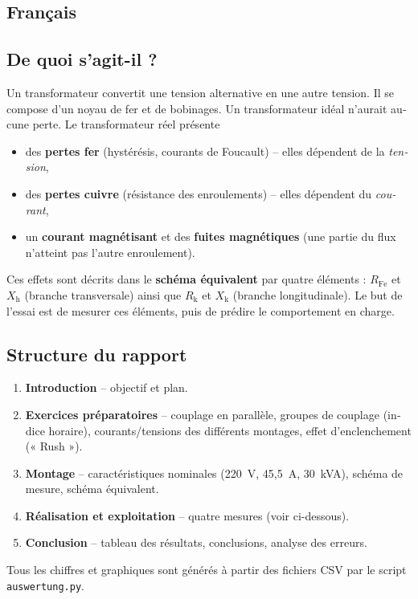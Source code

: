 \documentclass[a4paper,11pt]{article}
\begin{document}
\newpage
\begin{french}
\section{Français}

\subsection{De quoi s'agit-il ?}
Un transformateur convertit une tension alternative en une autre tension. Il se compose d'un noyau de fer et de bobinages. Un transformateur idéal n'aurait aucune perte. Le transformateur réel présente
\begin{itemize}[nosep]
  \item des \textbf{pertes fer} (hystérésis, courants de Foucault) -- elles dépendent de la \emph{tension},
  \item des \textbf{pertes cuivre} (résistance des enroulements) -- elles dépendent du \emph{courant},
  \item un \textbf{courant magnétisant} et des \textbf{fuites magnétiques} (une partie du flux n'atteint pas l'autre enroulement).
\end{itemize}
Ces effets sont décrits dans le \textbf{schéma équivalent} par quatre éléments : $R_\mathrm{Fe}$ et $X_\mathrm{h}$ (branche transversale) ainsi que $R_\mathrm{k}$ et $X_\mathrm{k}$ (branche longitudinale). Le but de l'essai est de mesurer ces éléments, puis de prédire le comportement en charge.

\subsection{Structure du rapport}
\begin{enumerate}[nosep]
  \item \textbf{Introduction} -- objectif et plan.
  \item \textbf{Exercices préparatoires} -- couplage en parallèle, groupes de couplage (indice horaire), courants/tensions des différents montages, effet d'enclenchement (« Rush »).
  \item \textbf{Montage} -- caractéristiques nominales (220~V, 45,5~A, 30~kVA), schéma de mesure, schéma équivalent.
  \item \textbf{Réalisation et exploitation} -- quatre mesures (voir ci-dessous).
  \item \textbf{Conclusion} -- tableau des résultats, conclusions, analyse des erreurs.
\end{enumerate}
Tous les chiffres et graphiques sont générés à partir des fichiers CSV par le script \texttt{auswertung.py}.


\end{french}
\end{document}
